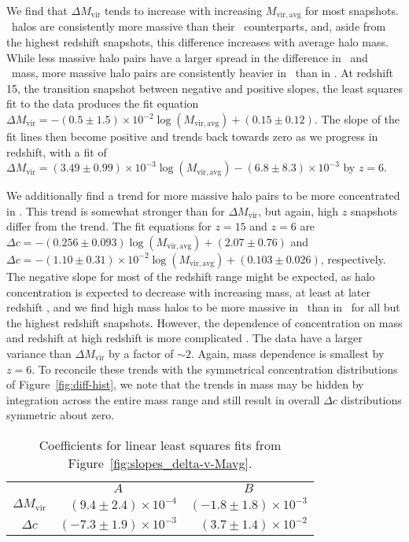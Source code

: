 We find that $\Delta M_{\mathrm{vir}}$ tends to increase with increasing $M_{\mathrm{vir,avg}}$ for most snapshots.  \lpt\ halos are consistently more massive than their \za\ counterparts, and, aside from the highest redshift snapshots, this difference increases with average halo mass.  While less massive halo pairs have a larger spread in the difference in \lpt\ and \za\ mass, more massive halo pairs are consistently heavier in \lpt\ than in \za.  At redshift 15, the transition snapshot between negative and positive slopes, the least squares fit to the data produces the fit equation $\Delta M_{\mathrm{vir}} = -(0.5 \pm 1.5) \times 10^{-2} \log(M_{\mathrm{vir,avg}}) + (0.15 \pm 0.12)$.   The slope of the fit lines then become positive and trends back towards zero as we progress in redshift, with a fit of $\Delta M_{\mathrm{vir}} = (3.49 \pm 0.99) \times 10^{-3} \log(M_{\mathrm{vir,avg}}) - (6.8 \pm 8.3) \times 10^{-3}$ by $z = 6$.

We additionally find a trend for more massive halo pairs to be more concentrated in \za.  This trend is somewhat stronger than for $\Delta M_{\mathrm{vir}}$, but again, high $z$ snapshots differ from the trend.  The fit equations for $z = 15$ and $z = 6$ are $\Delta c = -(0.256 \pm 0.093) \log(M_{\mathrm{vir,avg}}) + (2.07 \pm 0.76)$ and $\Delta c = -(1.10 \pm 0.31) \times 10^{-2} \log(M_{\mathrm{vir,avg}}) + (0.103 \pm 0.026)$, respectively.  The negative slope for most of the redshift range might be expected, as halo concentration is expected to decrease with increasing mass, at least at later redshift \citep{2007MNRAS.381.1450N}, and we find high mass halos to be more massive in \lpt\ than in \za\ for all but the highest redshift snapshots.  However, the dependence of concentration on mass and redshift at high redshift is more complicated \citep{2011ApJ...740..102K, 2012MNRAS.423.3018P}.  The data have a larger variance than $\Delta M_{\mathrm{vir}}$ by a factor of $\sim 2$.  Again, mass dependence is smallest by $z = 6$.  To reconcile these trends with the symmetrical concentration distributions of Figure~\ref{fig:diff-hist}, we note that the trends in mass may be hidden by integration across the entire mass range and still result in overall $\Delta c$ distributions symmetric about zero.

\begin{table}[t]
	\centering
	\caption{Coefficients for linear least squares fits from Figure~\ref{fig:slopes_delta-v-Mavg}.}
	\begin{tabular}{ c  r  r }
		\toprule
		                           &  \multicolumn{1}{c}{$A$}            &  \multicolumn{1}{c}{$B$} \\
		\cmidrule(l){2-3}
		$\Delta M_{\mathrm{vir}}$  &   $(9.4 \pm 2.4) \times 10^{-4}$  &  $(-1.8 \pm 1.8) \times 10^{-3}$ \\
		$\Delta c$                 &  $(-7.3 \pm 1.9) \times 10^{-3}$  &   $(3.7 \pm 1.4) \times 10^{-2}$ \\
		\bottomrule
	\end{tabular}
	\label{tab:coeffs_slopes}
\end{table}

